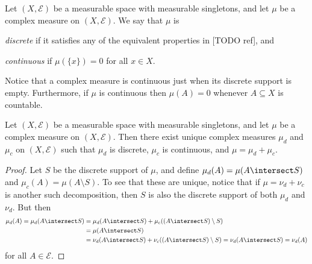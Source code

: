 \documentclass[article, a4paper, 11pt, oneside]{memoir}
\numberwithin{equation}{chapter}
\newcommand{\calE}{\mathcal{E}}
\begin{document}
\begin{definition}
    Let $(X,\calE)$ be a measurable space with measurable singletons, and let $\mu$ be a complex measure on $(X,\calE)$. We say that $\mu$ is
    \begin{enumdef}
        \item \emph{discrete} if it satisfies any of the equivalent properties in [TODO ref], and
        \item \emph{continuous} if $\mu(\{x\}) = 0$ for all $x \in X$.
    \end{enumdef}
\end{definition}
%
Notice that a complex measure is continuous just when its discrete support is empty. Furthermore, if $\mu$ is continuous then $\mu(A) = 0$ whenever $A \subseteq X$ is countable.


\begin{proposition}
    Let $(X,\calE)$ be a measurable space with measurable singletons, and let $\mu$ be a complex measure on $(X,\calE)$. Then there exist unique complex measures $\mu_d$ and $\mu_c$ on $(X,\calE)$ such that $\mu_d$ is discrete, $\mu_c$ is continuous, and $\mu = \mu_d + \mu_c$.
\end{proposition}

\begin{proof}
    Let $S$ be the discrete support of $\mu$, and define $\mu_d(A) = \mu(A \intersect S)$ and $\mu_c(A) = \mu(A \setminus S)$. To see that these are unique, notice that if $\mu = \nu_d + \nu_c$ is another such decomposition, then $S$ is also the discrete support of both $\mu_d$ and $\nu_d$. But then
    \begin{align*}
        \mu_d(A)
             = \mu_d(A \intersect S)
            &= \mu_d(A \intersect S) + \mu_c((A \intersect S) \setminus S) \\
            &= \mu(A \intersect S) \\
            &= \nu_d(A \intersect S) + \nu_c((A \intersect S) \setminus S)
             = \nu_d(A \intersect S)
             = \nu_d(A)
    \end{align*}
    for all $A \in \calE$.
\end{proof}



\nocite{*}

\printbibliography
\end{document}
